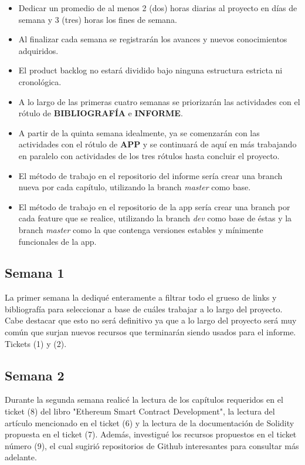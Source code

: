 \begin{itemize}
\item Dedicar un promedio de al menos 2 (dos) horas diarias al proyecto en días de semana y 3
(tres) horas los fines de semana.
\item Al finalizar cada semana se registrarán los avances y nuevos conocimientos adquiridos.
\item El product backlog no estará dividido bajo ninguna estructura estricta ni cronológica.
\item A lo largo de las primeras cuatro semanas se priorizarán las actividades con el rótulo de 
\textbf{BIBLIOGRAFÍA} e \textbf{INFORME}.
\item A partir de la quinta semana idealmente, ya se comenzarán con las actividades con el rótulo
de \textbf{APP} y se continuará de aquí en más trabajando en paralelo con actividades de los tres
rótulos hasta concluir el proyecto.
\item El método de trabajo en el repositorio del informe sería crear una branch nueva por cada
capítulo, utilizando la branch \textit{master} como base.
\item El método de trabajo en el repositorio de la app sería crear una branch por cada feature
que se realice, utilizando la branch \textit{dev} como base de éstas y la branch \textit{master}
como la que contenga versiones estables y mínimente funcionales de la app.
\end{itemize}

\subsection{Semana 1}
La primer semana la dediqué enteramente a filtrar todo el grueso de links y bibliografía para
seleccionar a base de cuáles trabajar a lo largo del proyecto. Cabe destacar que esto no será 
definitivo ya que a lo largo del proyecto será muy común que surjan nuevos recursos que terminarán
siendo usados para el informe. Tickets (1) y (2).

\subsection{Semana 2}
Durante la segunda semana realicé la lectura de los capítulos requeridos en el ticket (8) del 
libro "Ethereum Smart Contract Development", la lectura del artículo mencionado en el ticket (6) y
la lectura de la documentación de Solidity propuesta en el ticket (7). Además, investigué los
recursos propuestos en el ticket número (9), el cual sugirió repositorios de Github interesantes
para consultar más adelante.

